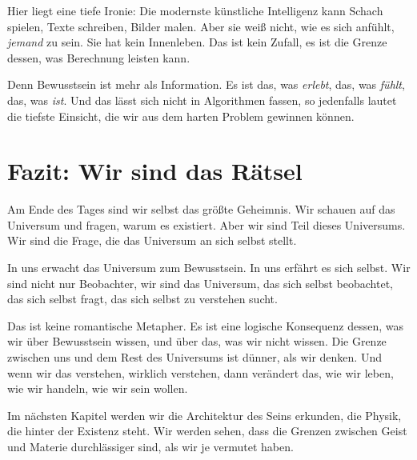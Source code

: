 Hier liegt eine tiefe Ironie: Die modernste künstliche Intelligenz kann Schach spielen, Texte schreiben, Bilder malen. Aber sie weiß nicht, wie es sich anfühlt, \emph{jemand} zu sein. Sie hat kein \glqq Innenleben\grqq{}. Das ist kein Zufall, es ist die Grenze dessen, was Berechnung leisten kann.

Denn Bewusstsein ist mehr als Information. Es ist das, was \emph{erlebt}, das, was \emph{fühlt}, das, was \emph{ist}. Und das lässt sich nicht in Algorithmen fassen, so jedenfalls lautet die tiefste Einsicht, die wir aus dem harten Problem gewinnen können.

\section{Fazit: Wir sind das Rätsel}

Am Ende des Tages sind wir selbst das größte Geheimnis. Wir schauen auf das Universum und fragen, warum es existiert. Aber wir sind Teil dieses Universums. Wir sind die Frage, die das Universum an sich selbst stellt.

In uns erwacht das Universum zum Bewusstsein. In uns erfährt es sich selbst. Wir sind nicht nur Beobachter, wir sind das Universum, das sich selbst beobachtet, das sich selbst fragt, das sich selbst zu verstehen sucht.

Das ist keine romantische Metapher. Es ist eine logische Konsequenz dessen, was wir über Bewusstsein wissen, und über das, was wir nicht wissen. Die Grenze zwischen uns und dem Rest des Universums ist dünner, als wir denken. Und wenn wir das verstehen, wirklich verstehen, dann verändert das, wie wir leben, wie wir handeln, wie wir sein wollen.

Im nächsten Kapitel werden wir die Architektur des Seins erkunden, die Physik, die hinter der Existenz steht. Wir werden sehen, dass die Grenzen zwischen Geist und Materie durchlässiger sind, als wir je vermutet haben.
